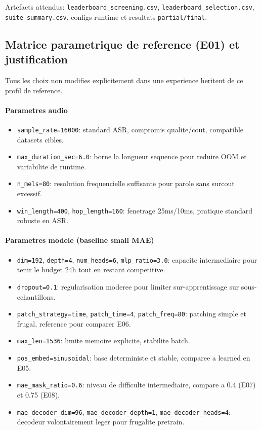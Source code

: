 \documentclass[11pt,a4paper]{article}
\begin{document}
Artefacts attendus:
\texttt{leaderboard\_screening.csv},
\texttt{leaderboard\_selection.csv},
\texttt{suite\_summary.csv},
configs runtime et resultats \texttt{partial/final}.

\subsection{Matrice parametrique de reference (E01) et justification}
Tous les choix non modifies explicitement dans une experience heritent de ce profil de reference.

\paragraph{Parametres audio}
\begin{itemize}
\item \texttt{sample\_rate=16000}: standard ASR, compromis qualite/cout, compatible datasets cibles.
\item \texttt{max\_duration\_sec=6.0}: borne la longueur sequence pour reduire OOM et variabilite de runtime.
\item \texttt{n\_mels=80}: resolution frequencielle suffisante pour parole sans surcout excessif.
\item \texttt{win\_length=400}, \texttt{hop\_length=160}: fenetrage 25ms/10ms, pratique standard robuste en ASR.
\end{itemize}

\paragraph{Parametres modele (baseline small MAE)}
\begin{itemize}
\item \texttt{dim=192}, \texttt{depth=4}, \texttt{num\_heads=6}, \texttt{mlp\_ratio=3.0}: capacite intermediaire pour tenir le budget 24h tout en restant competitive.
\item \texttt{dropout=0.1}: regularisation moderee pour limiter sur-apprentissage sur sous-echantillons.
\item \texttt{patch\_strategy=time}, \texttt{patch\_time=4}, \texttt{patch\_freq=80}: patching simple et frugal, reference pour comparer E06.
\item \texttt{max\_len=1536}: limite memoire explicite, stabilite batch.
\item \texttt{pos\_embed=sinusoidal}: base deterministe et stable, comparee a learned en E05.
\item \texttt{mae\_mask\_ratio=0.6}: niveau de difficulte intermediaire, compare a 0.4 (E07) et 0.75 (E08).
\item \texttt{mae\_decoder\_dim=96}, \texttt{mae\_decoder\_depth=1}, \texttt{mae\_decoder\_heads=4}: decodeur volontairement leger pour frugalite pretrain.
\end{itemize}
\end{document}
